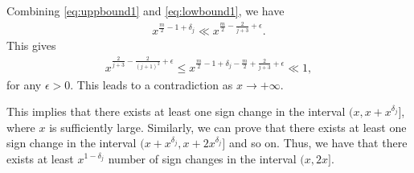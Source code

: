 \documentclass[10pt]{amsart}
\begin{document}
Combining \eqref{eq:uppbound1} and \eqref{eq:lowbound1}, we have \begin{align}
    x^{\frac{m}{2}-1+\delta_j} \ll x^{\frac{m}{2}-\frac{2}{j+3}+\epsilon}.
\end{align}
This gives \begin{align}
    x^{\frac{2}{j+3}-\frac{2}{(j+1)^2}+\epsilon} \leq x^{\frac{m}{2}-1+\delta_j-\frac{m}{2}+\frac{2}{j+3}+\epsilon} \ll 1,
\end{align}
for any $\epsilon > 0$. This leads to a contradiction as $x \to +\infty$.

This implies that there exists at least one sign change in the interval $(x, x+x^{\delta_j}]$, where $x$ is sufficiently large. Similarly, we can prove that there exists at least one sign change in the interval $(x+x^{\delta_j}, x+2x^{\delta_j}]$ and so on. Thus, we have that there exists at least $x^{1-\delta_j}$ number of sign changes in the interval $(x,2x]$.



\end{document}
